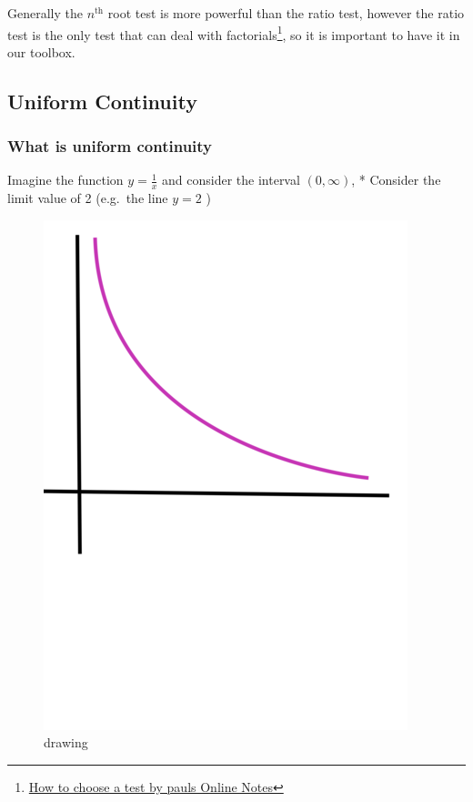 \documentclass[class=article, crop=false]{standalone}
\begin{document}
Generally the \(n^{\text{th}}\) root test is more powerful than the
ratio test, however the ratio test is the only test that can deal with
factorials\footnote{\href{http://tutorial.math.lamar.edu/Classes/CalcII/SeriesStrategy.aspx}{How
  to choose a test by pauls Online Notes}}, so it is important to have
it in our toolbox.

\hypertarget{uniform-continuity}{%
\subsection{Uniform Continuity}\label{uniform-continuity}}

\hypertarget{what-is-uniform-continuity}{%
\subsubsection{What is uniform
continuity}\label{what-is-uniform-continuity}}

Imagine the function \(y= \frac{1}{x}\) and consider the interval
\(\left( 0,\infty \right) \), * Consider the limit value of 2 (e.g.~the
line \(y= 2\) )

\begin{figure}
\centering
\includegraphics{"./media/ComplexSeries/drawing.png"}
\caption{drawing}
\end{figure}
\end{document}
